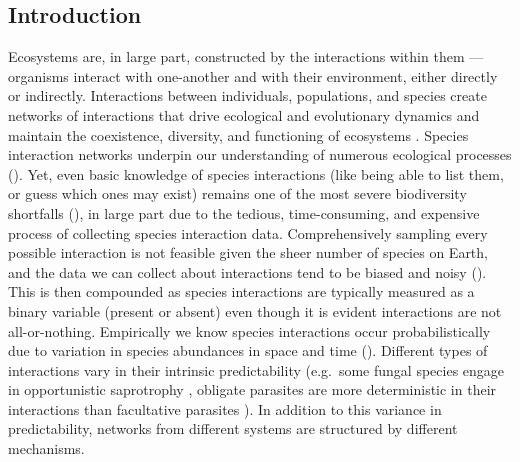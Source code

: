 \begin{refsection}

\section{Introduction}\label{introduction}

Ecosystems are, in large part, constructed by the interactions within
them --- organisms interact with one-another and with their environment,
either directly or indirectly. Interactions between individuals,
populations, and species create networks of interactions that drive
ecological and evolutionary dynamics and maintain the coexistence,
diversity, and functioning of ecosystems \cite{Delmas2018Analysing, Landi2018Complexity, Albrecht2018Plant}. Species interaction networks
underpin our understanding of numerous ecological processes
(\cite{Pascual2006EcoNet, Heleno2014EcoNet}). Yet, even basic knowledge
of species interactions (like being able to list them, or guess which
ones may exist) remains one of the most severe biodiversity shortfalls
(\cite{Hortal2015Seven}), in large part due to the tedious,
time-consuming, and expensive process of collecting species interaction
data. Comprehensively sampling every possible interaction is not
feasible given the sheer number of species on Earth, and the data we can
collect about interactions tend to be biased and noisy
(\cite{deAguiar2019RevBia}). This is then compounded as species
interactions are typically measured as a binary variable (present or
absent) even though it is evident interactions are not all-or-nothing.
Empirically we know species interactions occur probabilistically due to
variation in species abundances in space and time
(\cite{Poisot2015Species}). Different types of interactions vary in their
intrinsic predictability (e.g.~some fungal species engage in
opportunistic saprotrophy \cite{Smith2017GroEvi}, obligate parasites are
more deterministic in their interactions than facultative parasites
\cite{Poisot2013FacObl, Luong2019FacPar}). In addition to this variance
in predictability, networks from different systems are structured by
different mechanisms.


\end{refsection}
